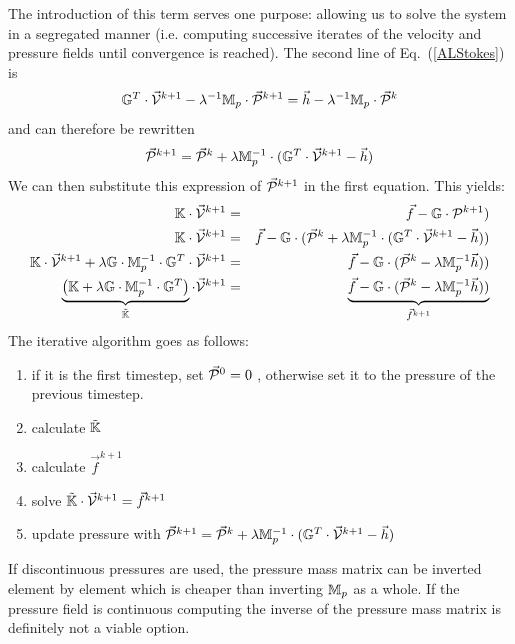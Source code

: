 The introduction of this term serves one purpose: allowing us to solve the system 
in a segregated manner (i.e. computing successive iterates of the velocity and pressure 
fields until convergence is reached). The second line of Eq.~(\ref{ALStokes}) is 
\[
{\mathbb{G}}^T \cdot \vec{\cal V}^{k+1} - \lambda^{-1} \mathbb{M}_p \cdot \vec{\cal P}^{k+1} = \vec{h} - \lambda^{-1} \mathbb{M}_p \cdot \vec{\cal P}^k
\]
and can therefore be rewritten
\[
\vec{\cal P}^{k+1} = \vec{\cal P}^k + \lambda \mathbb{M}_p^{-1} \cdot ({\mathbb{G}}^T \cdot \vec{\cal V}^{k+1} - \vec h)
\]
We can then substitute this expression of $\vec{\cal P}^{k+1}$ in the first equation. This yields:
\begin{eqnarray}
{\mathbb{K}} \cdot \vec{\cal V}^{k+1}  
&=& \vec f - {\mathbb{G}} \cdot {\cal P}^{k+1}) \\
{\mathbb{K}} \cdot \vec{\cal V}^{k+1}  
&=& \vec f - {\mathbb{G}} \cdot ( \vec{\cal P}^k + \lambda \mathbb{M}_p^{-1} \cdot  ({\mathbb{G}}^T \cdot \vec{\cal V}^{k+1} - \vec h)  ) \\
{\mathbb{K}} \cdot \vec{\cal V}^{k+1} + \lambda {\mathbb{G}} \cdot \mathbb{M}_p^{-1} \cdot {\mathbb{G}}^T \cdot \vec{\cal V}^{k+1} 
&=& \vec f - {\mathbb{G}} \cdot ( \vec{\cal P}^k - \lambda \mathbb{M}_p^{-1}\vec h)  ) \\
\underbrace{  \left(  {\mathbb{K}}  + \lambda {\mathbb{G}} \cdot \mathbb{M}_p^{-1} \cdot {\mathbb{G}}^T \right)   }_{\tilde{{\mathbb{K}}}  } \cdot \vec{\cal V}^{k+1} 
&=& \underbrace{ \vec f - {\mathbb{G}} \cdot ( \vec{\cal P}^k - \lambda \mathbb{M}_p^{-1}\vec h)  )}_{\vec{f}^{k+1}} \\
\end{eqnarray}
The iterative algorithm goes as follows:
\begin{mdframed}[backgroundcolor=blue!5]
\begin{enumerate}
\item if it is the first timestep, set $\vec{\cal P}^0=0$ , otherwise set it to the pressure of the previous timestep.
\item calculate $\tilde{{\mathbb{K}}}$
\item calculate $\vec{f}^{k+1}$
\item solve $\tilde{{\mathbb{K}}} \cdot \vec{\cal V}^{k+1} = \vec{f}^{k+1}$
\item update pressure with 
$\vec{\cal P}^{k+1} = \vec{\cal P}^k + \lambda \mathbb{M}_p^{-1} \cdot ({\mathbb{G}}^T \cdot \vec{\cal V}^{k+1} - \vec h)$
\end{enumerate}
\end{mdframed}

\begin{remark} 
If discontinuous pressures are used, the pressure mass matrix can be inverted element by element which is 
cheaper than inverting ${\mathbb{M}}_p$ as a whole. If the pressure field is continuous computing the inverse 
of the pressure mass matrix is definitely not a viable option.
\end{remark}


